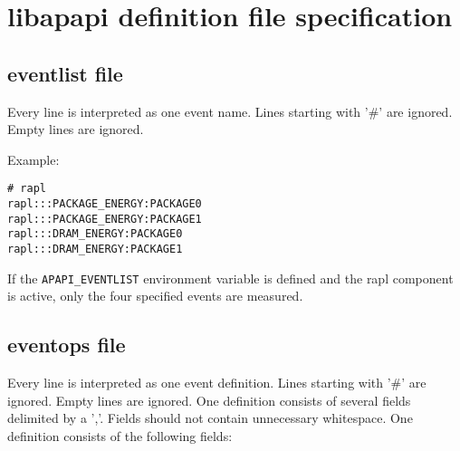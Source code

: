 \section{libapapi definition file specification}
\label{appendixapapi}

\subsection{eventlist file}

Every line is interpreted as one event name.
Lines starting with '\#' are ignored.
Empty lines are ignored.

Example:

\begin{verbatim}
# rapl
rapl:::PACKAGE_ENERGY:PACKAGE0
rapl:::PACKAGE_ENERGY:PACKAGE1
rapl:::DRAM_ENERGY:PACKAGE0
rapl:::DRAM_ENERGY:PACKAGE1
\end{verbatim}

If the \verb+APAPI_EVENTLIST+ environment variable is defined and the rapl component is active, only the four specified events are measured.


\subsection{eventops file}

Every line is interpreted as one event definition.
Lines starting with '\#' are ignored.
Empty lines are ignored.
One definition consists of several fields delimited by a ','.
Fields should not contain unnecessary whitespace.
One definition consists of the following fields:

